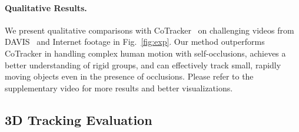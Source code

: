 \vspace{-1em}
\paragraph{\textbf{Qualitative Results.}}
We present qualitative comparisons with CoTracker~\cite{cotracker} on challenging videos from DAVIS~\cite{davis} and Internet footage in Fig.~\ref{fig:exp}.
Our method outperforms CoTracker in handling complex human motion with self-occlusions,  achieves a better understanding of rigid groups, and can effectively track small, rapidly moving objects even in the presence of occlusions. Please refer to the supplementary video for more results and better visualizations.







\subsection{3D Tracking Evaluation}
\label{sec:3d tracking eval}


